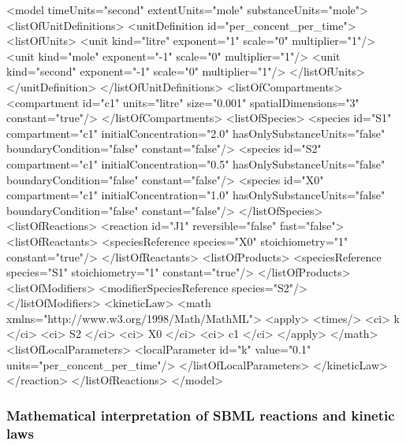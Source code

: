 \begin{example}
<model timeUnits="second" extentUnits="mole" substanceUnits="mole">
    <listOfUnitDefinitions>
        <unitDefinition id="per_concent_per_time">
            <listOfUnits>
                <unit kind="litre"  exponent="1"  scale="0" multiplier="1"/>
                <unit kind="mole"   exponent="-1" scale="0" multiplier="1"/>
                <unit kind="second" exponent="-1" scale="0" multiplier="1"/>
            </listOfUnits>
        </unitDefinition>
    </listOfUnitDefinitions>
    <listOfCompartments>
        <compartment id="c1" units="litre" size="0.001" spatialDimensions="3" constant="true"/>
    </listOfCompartments>
    <listOfSpecies>
        <species id="S1" compartment="c1" initialConcentration="2.0" 
                 hasOnlySubstanceUnits="false" boundaryCondition="false" constant="false"/>
        <species id="S2" compartment="c1" initialConcentration="0.5" 
                 hasOnlySubstanceUnits="false" boundaryCondition="false" constant="false"/>
        <species id="X0" compartment="c1" initialConcentration="1.0" 
                 hasOnlySubstanceUnits="false" boundaryCondition="false" constant="false"/>
    </listOfSpecies>
    <listOfReactions>
        <reaction id="J1" reversible="false" fast="false">
            <listOfReactants>
                <speciesReference species="X0" stoichiometry="1" constant="true"/>
            </listOfReactants>
            <listOfProducts>
                <speciesReference species="S1" stoichiometry="1" constant="true"/>
            </listOfProducts>
            <listOfModifiers>
                <modifierSpeciesReference species="S2"/>
            </listOfModifiers>
            <kineticLaw>
                <math xmlns="http://www.w3.org/1998/Math/MathML">
                    <apply>
                        <times/> <ci> k </ci> <ci> S2 </ci> <ci> X0 </ci> <ci> c1 </ci>
                    </apply>
                </math>
                <listOfLocalParameters>
                    <localParameter id="k" value="0.1" units="per_concent_per_time"/>
                </listOfLocalParameters>
            </kineticLaw>
        </reaction>
    </listOfReactions>
</model>
\end{example}


\subsubsection{Mathematical interpretation of SBML reactions and kinetic laws}
\label{sec:about-kinetic-laws}

